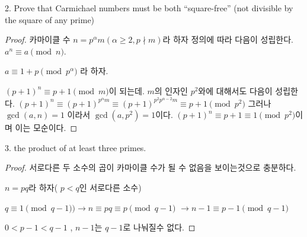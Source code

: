 2. Prove that Carmichael numbers must be both “square-free” (not divisible by the square of any prime) 

\begin{proof}
카마이클 수 $n = p^\alpha m( \alpha \ge 2 ,  p \nmid m )$라 하자
정의에 따라 다음이 성립한다. 
$a^{n} \equiv a \pmod{n}$.

$ a \equiv 1 + p \pmod{p^\alpha}$ 라 하자.

$(p+1)^{n} \equiv p+1 \pmod{m}$이 되는데. 
$m$의 인자인 $p^2$와에 대해서도 다음이 성립한다.
$(p+1)^{n} \equiv (p+1)^{p^\alpha m} \equiv (p+1)^{p^2 p^{\alpha-2} m}  \equiv p+1 \pmod{p^2}$
그러나 $\gcd(a,n) = 1$ 이라서 $\gcd(a, p^2) = 1$이다.
$(p+1)^{n} \equiv p+1  \equiv 1 \pmod{p^2}$이며 이는 모순이다.
\end{proof}



3. the product of at least three primes. 

\begin{proof}
    서로다른 두 소수의 곱이 카마이클 수가 될 수 없음을 보이는것으로 충분하다.

    $n=pq$라 하자( $p<q$인 서로다른 소수)

    $q \equiv 1 \pmod{q - 1} )\rightarrow n \equiv pq \equiv p \pmod{q - 1}$
    $\rightarrow n - 1 \equiv p - 1 \pmod{q - 1}$

    $0 < p-1 < q - 1$ , $n - 1$는 $q - 1$로 나눠질수 없다. 
\end{proof}


